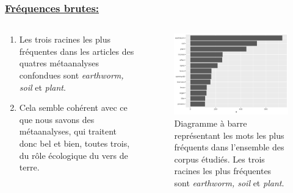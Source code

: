 \documentclass[xcolor=dvipsnames]{beamer}
\begin{document}
	\begin{frame}
		\frametitle{\underline{Fréquences brutes:}} 
		\begin{columns}
			\begin{column}{0.5\textwidth} %
				\begin{enumerate}
					\item Les trois racines les plus fréquentes dans les articles des quatres métaanalyses confondues sont \textit{earthworm, soil} et \textit{plant}.
					\item Cela semble cohérent avec ce que nous savons des métaanalyses, qui traitent donc bel et bien, toutes trois, du rôle écologique du vers de terre.
				\end{enumerate}
			\end{column}
			\begin{column}{0.5\textwidth}
				\begin{figure}[htb] %
					\begin{center} %
						\includegraphics[width=1\textwidth]{freq_all_MA.png}
						\caption{Diagramme à barre représentant les mots les plus fréquents dans l'ensemble des corpus étudiés. Les trois racines les plus fréquentes sont \textit{earthworm, soil} et \textit{plant}.}\label{all_freq}
					\end{center}
				\end{figure}
			\end{column}
		\end{columns}
	\end{frame}
\end{document}

